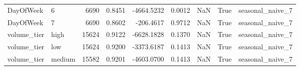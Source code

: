 \begin{table}
\begin{tabular}{llrrrrrrl}
DayOfWeek & 6 & 6690 & 0.8451 & -4664.5232 & 0.0012 & NaN & True & seasonal\_naive\_7 \\
DayOfWeek & 7 & 6690 & 0.8602 & -206.4617 & 0.9712 & NaN & True & seasonal\_naive\_7 \\
volume\_tier & high & 15624 & 0.9122 & -6628.1828 & 0.1370 & NaN & True & seasonal\_naive\_7 \\
volume\_tier & low & 15624 & 0.9200 & -3373.6187 & 0.1413 & NaN & True & seasonal\_naive\_7 \\
volume\_tier & medium & 15582 & 0.9201 & -4603.0700 & 0.1413 & NaN & True & seasonal\_naive\_7 \\
\bottomrule
\end{tabular}
\end{table}
